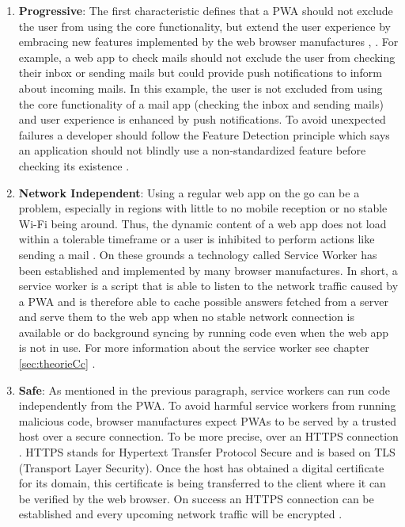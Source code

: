 \begin{enumerate} 
	\item  \textbf{Progressive}: The first characteristic defines that a  \acs{PWA} should not exclude the user from using the core functionality, but extend the user experience by embracing new features implemented by the web browser manufactures \cite[p. 100]{liebelProgressiveWebApps2019}, \cite[p. 2]{hajianProgressiveWebApps2019}. For example, a web app to check mails should not exclude the user from checking their inbox or sending mails but could provide push notifications to inform about incoming mails. In this example, the user is not excluded from using the core functionality of a mail app (checking the inbox and sending mails) and user experience is enhanced by push notifications. To avoid unexpected failures a developer should follow the Feature Detection principle which says an application should not blindly use a non-standardized feature before checking its existence \cite[p. 101]{liebelProgressiveWebApps2019}.

	\item \textbf{Network Independent}: Using a regular web app on the go can be a problem, especially in regions with little to no mobile reception or no stable Wi-Fi being around. Thus, the dynamic content of a web app does not load within a tolerable timeframe or a user is inhibited to perform actions like sending a mail \cite[p. 106]{liebelProgressiveWebApps2019}. On these grounds a technology called Service Worker has been established and implemented by many browser manufactures. In short, a service worker is a script that is able to listen to the network traffic caused by a  \acs{PWA} and is therefore able to cache possible answers fetched from a server and serve them to the web app when no stable network connection is available or do background syncing by running code even when the web app is not in use. For more information about the service worker see chapter \ref{sec:theorieCc} \cite[p. 43]{sheppardBeginningProgressiveWeb2017}.

	\item \textbf{Safe}: As mentioned in the previous paragraph, service workers can run code independently from the  \acs{PWA}. To avoid harmful service workers from running malicious code, browser manufactures expect  \acs{PWA}s to be served by a trusted host over a secure connection. To be more precise, over an HTTPS connection \cite[p. 24]{sheppardBeginningProgressiveWeb2017}. HTTPS stands for Hypertext Transfer Protocol Secure and is based on TLS (Transport Layer Security). Once the host has obtained a digital certificate for its domain, this certificate is being transferred to the client where it can be verified by the web browser. On success an HTTPS connection can be established and every upcoming network traffic will be encrypted \cite[pp. 112-113]{liebelProgressiveWebApps2019}.


\end{enumerate}

